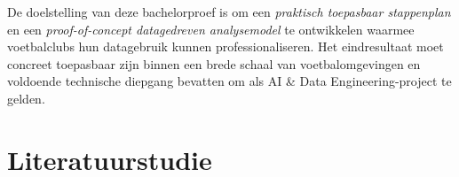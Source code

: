 De doelstelling van deze bachelorproef is om een \textit{praktisch toepasbaar stappenplan} en een \textit{proof-of-concept datagedreven analysemodel} te ontwikkelen waarmee voetbalclubs hun datagebruik kunnen professionaliseren.
Het eindresultaat moet concreet toepasbaar zijn binnen een brede schaal van voetbalomgevingen en voldoende technische diepgang bevatten om als AI \& Data Engineering-project te gelden.


\section{Literatuurstudie}%
\label{sec:literatuurstudie}







